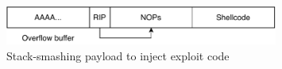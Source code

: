 \begin{figure}[htp!]
    \centering
    \includegraphics[width=0.8\textwidth]{assets/figures/chapter2/stack-smashing-payload.pdf}
    \caption{Stack-smashing payload to inject exploit code}
    \label{fig:stack-smashing-payload}
\end{figure}

